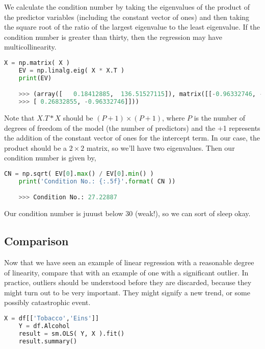 We calculate the condition number by taking the eigenvalues of the product of the predictor variables (including the constant vector of ones) and then taking the square root of the ratio of the largest eigenvalue to the least eigenvalue. If the condition number is greater than thirty, then the regression may have multicollinearity.

\begin{lstlisting}[language=Python]	
    X = np.matrix( X )
    EV = np.linalg.eig( X * X.T )
    print(EV)

    >>> (array([   0.18412885,  136.51527115]), matrix([[-0.96332746, -0.26832855],
    >>> [ 0.26832855, -0.96332746]]))

\end{lstlisting}

Note that $X.T * X$ should be $( P + 1 ) \times ( P + 1 )$, where $P$ is the number of degrees of freedom of the model (the number of predictors) and the +1 represents the addition of the constant vector of ones for the intercept term. In our case, the product should be a $2 \times 2$ matrix, so we’ll have two eigenvalues. Then our condition number is given by,


\begin{lstlisting}[language=Python]	
    CN = np.sqrt( EV[0].max() / EV[0].min() )
    print('Condition No.: {:.5f}'.format( CN ))

    >>> Condition No.: 27.22887
\end{lstlisting}

Our condition number is juuust below 30 (weak!), so we can sort of sleep okay.

\subsection{Comparison}

Now that we have seen an example of linear regression with a reasonable degree of linearity, compare that with an example of one with a significant outlier. In practice, outliers should be understood before they are discarded, because they might turn out to be very important. They might signify a new trend, or some possibly catastrophic event.

\begin{lstlisting}[language=Python]
    X = df[['Tobacco','Eins']]
    Y = df.Alcohol
    result = sm.OLS( Y, X ).fit()
    result.summary()
\end{lstlisting}

